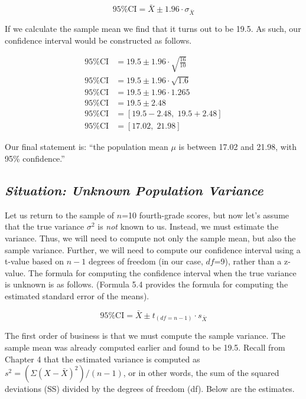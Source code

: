 \documentclass[12pt]{article}
\begin{document}
\begin{equation}
95\%\text{CI} = \bar{X} \pm 1.96 \cdot \sigma_{\bar{X}} \tag{from 5.2}
\end{equation}

If we calculate the sample mean we find that it turns out to be 19.5. As such, our confidence interval would be constructed as follows.

\begin{align*}
95\%\text{CI} &= 19.5 \pm 1.96 \cdot \sqrt{\frac{16}{10}} \\
95\%\text{CI} &= 19.5 \pm 1.96 \cdot \sqrt{1.6} \\
95\%\text{CI} &= 19.5 \pm 1.96 \cdot 1.265 \\
95\%\text{CI} &= 19.5 \pm 2.48 \\
95\%\text{CI} &= [19.5 - 2.48, \; 19.5 + 2.48] \\
95\%\text{CI} &= [17.02, \; 21.98]
\end{align*}

Our final statement is: ``the population mean $\mu$ is between 17.02 and 21.98, with 95\% confidence.''

\subsection*{\textit{Situation: Unknown Population Variance}}

\hspace{1em} Let us return to the sample of $n$=10 fourth-grade scores, but now let's assume that the true variance $\sigma^2$ is \textit{not} known to us. Instead, we must estimate the variance. Thus, we will need to compute not only the sample mean, but also the sample variance. Further, we will need to compute our confidence interval using a t-value based on $n-1$ degrees of freedom (in our case, $df$=9), rather than a z-value. The formula for computing the confidence interval when the true variance is unknown is as follows. (Formula 5.4 provides the formula for computing the estimated standard error of the means).

\begin{equation}
95\%\text{CI} = \bar{X} \pm t_{(df=n-1)} \cdot s_{\bar{X}} \tag{5.5}
\end{equation}

The first order of business is that we must compute the sample variance. The sample mean was already computed earlier and found to be 19.5. Recall from Chapter 4 that the estimated variance is computed as $s^2 = (\Sigma(X - \bar{X})^2)/(n-1)$, or in other words, the sum of the squared deviations (SS) divided by the degrees of freedom (df). Below are the estimates.
\end{document}
